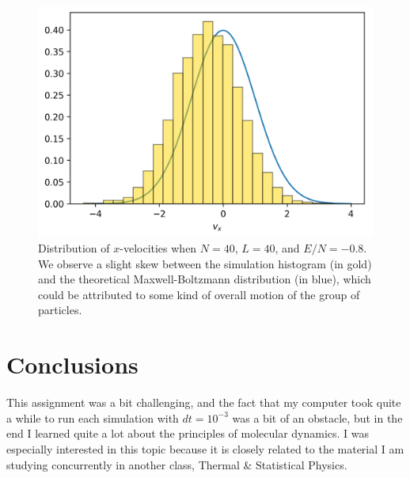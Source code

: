 \documentclass{article}
\begin{document}
\begin{figure}[H]
    \centering
    \includegraphics[width=5in]{homework8/p3b.png}
    \caption{Distribution of $x$-velocities when $N=40$, $L=40$, and $E/N=-0.8$. We observe a slight skew between the simulation histogram (in gold) and the theoretical Maxwell-Boltzmann distribution (in blue), which could be attributed to some kind of overall motion of the group of particles.}
    \label{fig:3b}
\end{figure}

\bigskip
{}
\medskip



\section{Conclusions}

This assignment was a bit challenging, and the fact that my computer took quite a while to run each simulation with $dt=10^{-3}$ was a bit of an obstacle, but in the end I learned quite a lot about the principles of molecular dynamics. I was especially interested in this topic because it is closely related to the material I am studying concurrently in another class, Thermal \& Statistical Physics.
\end{document}
